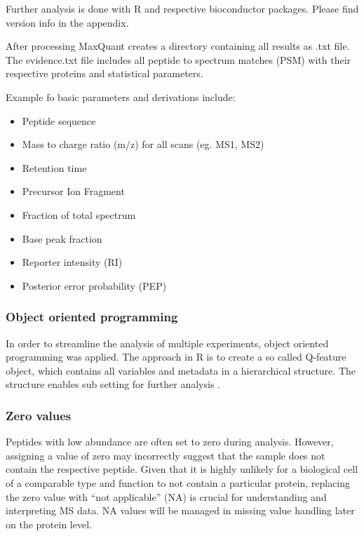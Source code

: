 \documentclass[
  11pt,
]{article}
\providecommand{\tightlist}{%
  \setlength{\itemsep}{0pt}\setlength{\parskip}{0pt}}
\begin{document}
Further analysis is done with R and respective bioconductor packages.
Please find version info in the appendix.

After processing MaxQuant creates a directory containing all results as
.txt file. The evidence.txt file includes all peptide to spectrum
matches (PSM) with their respective proteins and statistical parameters.

Example fo basic parameters and derivations include:

\begin{itemize}
\tightlist
\item
  Peptide sequence
\item
  Mass to charge ratio (m/z) for all scans (eg. MS1, MS2)
\item
  Retention time
\item
  Precursor Ion Fragment
\item
  Fraction of total spectrum
\item
  Base peak fraction
\item
  Reporter intensity (RI)
\item
  Posterior error probability (PEP)
\end{itemize}

\hypertarget{object-oriented-programming}{%
\subsubsection{Object oriented
programming}\label{object-oriented-programming}}

In order to streamline the analysis of multiple experiments, object
oriented programming was applied. The approach in R is to create a so
called Q-feature object, which contains all variables and metadata in a
hierarchical structure. The structure enables sub setting for further
analysis \citep{Vanderaa2021}.

\hypertarget{zero-values}{%
\subsubsection{Zero values}\label{zero-values}}

Peptides with low abundance are often set to zero during analysis.
However, assigning a value of zero may incorrectly suggest that the
sample does not contain the respective peptide. Given that it is highly
unlikely for a biological cell of a comparable type and function to not
contain a particular protein, replacing the zero value with ``not
applicable'' (NA) is crucial for understanding and interpreting MS data.
NA values will be managed in missing value handling later on the protein
level.
\end{document}
